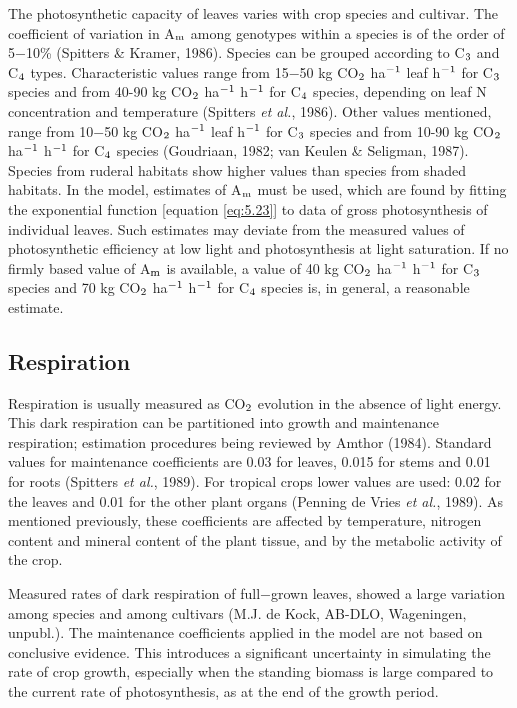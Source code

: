 The photosynthetic capacity of leaves varies with crop species and cultivar. The coefficient of
variation in A$_{{\rm m}}$ among genotypes within a species is of the order of 5$-$10\%
(Spitters \& Kramer, 1986). Species can be grouped according to C$_{{\rm 3}}$ and C$_{{\rm 4}}$ types.
Characteristic values range from 15$-$50 kg CO$_{{\rm 2}}$ ha$^{{\rm -}{1}}$ leaf h$^{{\rm -}{1}}$ 
for C$_{{\rm 3}}$ species and from 40-90
kg CO$_{{\rm 2}}$ ha$^{{\rm -1}}$ h$^{{\rm -1}}$ for C$_{{\rm 4}}$ species, depending on leaf 
N concentration and temperature (Spitters {\it et al.}, 1986). Other values mentioned, 
range from 10$-$50 kg CO$_{{\rm 2}}$ ha$^{{\rm -}{1}}$ leaf h$^{{\rm -}{1}}$ for
C$_{{\rm 3}}$ species and from 10-90 kg CO$_{{\rm 2}}$ ha$^{{\rm -1}}$ h$^{{\rm -1}}$ 
for C$_{{\rm 4}}$ species (Goudriaan, 1982; van Keulen \&
Seligman, 1987). Species from ruderal habitats show higher values than species from
shaded habitats. In the model, estimates of A$_{{\rm m}}$ must be used, which are found by fitting
the exponential function [equation \ref{eq:5.23}] to data of gross photosynthesis of individual
leaves. Such estimates may deviate from the measured values of photosynthetic efficiency
at low light and photosynthesis at light saturation. If no firmly based value of A$_{{\rm m}}$ is
available, a value of 40 kg CO$_{{\rm 2}}$ ha$^{{\rm -1}}$ h$^{{\rm -}{1}}$ for C$_{{\rm 3}}$ 
species and 70 kg CO$_{{\rm 2}}$ ha$^{{\rm -1}}$ h$^{{\rm -1}}$ for C$_{{\rm 4}}$
species is, in general, a reasonable estimate.

\subsection{Respiration} 

Respiration is usually measured as CO$_{{\rm 2}}$ evolution in the absence of light energy. This
dark respiration can be partitioned into growth and maintenance respiration; estimation
procedures being reviewed by Amthor (1984). Standard values for maintenance coefficients are 
0.03 for leaves, 0.015 for stems and 0.01 for roots (Spitters {\it et al.}, 1989). For
tropical crops lower values are used: 0.02 for the leaves and 0.01 for the other plant
organs (Penning de Vries {\it et al.}, 1989). As mentioned previously, these coefficients are
affected by temperature, nitrogen content and mineral content of the plant tissue, and by
the metabolic activity of the crop.

Measured rates of dark respiration of full$-$grown leaves, showed a large variation among
species and among cultivars (M.J. de Kock, AB-DLO, Wageningen, unpubl.). The
maintenance coefficients applied in the model are not based on conclusive evidence. This
introduces a significant uncertainty in simulating the rate of crop growth, especially when
the standing biomass is large compared to the current rate of photosynthesis, as at the end
of the growth period.   


